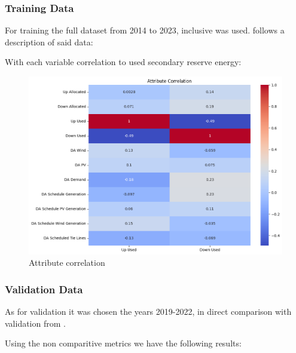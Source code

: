 \subsubsection{Training Data}
For training the full dataset from 2014 to 2023, inclusive was used. follows a description of said data:



With each variable correlation to used secondary reserve energy:

\begin{figure}[H]
    \centering
    \includegraphics[width=\textwidth]{plots/correlation_heatmap.png}
    \caption{Attribute correlation}
    \label{fig:Attribute_correlation}
  \end{figure}
  
  
  

\subsubsection{Validation Data}
As for validation it was chosen the years 2019-2022, in direct comparison with validation from \cite{Algarvio2024}.\par
Using the non comparitive metrics we have the following results:


